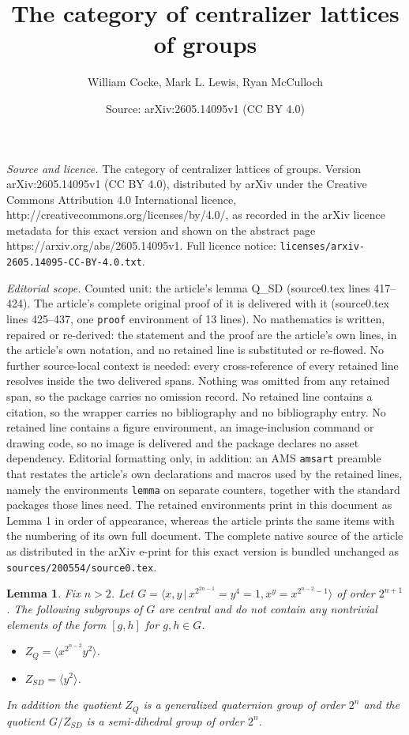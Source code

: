 \documentclass[10pt,a4paper]{amsart}
\title{The category of centralizer lattices of groups}
\author{William Cocke, Mark L. Lewis, Ryan McCulloch}
\date{Source: arXiv:2605.14095v1 (CC BY 4.0)}
\newtheorem{lemma}{Lemma}
\begin{document}
\maketitle

\noindent\emph{Source and licence.} The category of centralizer lattices of groups. Version arXiv:2605.14095v1 (CC BY 4.0), distributed by arXiv under the Creative Commons Attribution 4.0 International licence, http://creativecommons.org/licenses/by/4.0/, as recorded in the arXiv licence metadata for this exact version and shown on the abstract page https://arxiv.org/abs/2605.14095v1. Full licence notice: \texttt{licenses/arxiv-2605.14095-CC-BY-4.0.txt}.\par\smallskip

\noindent\textit{Editorial scope.} Counted unit: the article's lemma Q\_SD (source0.tex lines 417--424). The article's complete original proof of it is delivered with it (source0.tex lines 425--437, one \texttt{proof} environment of 13 lines). No mathematics is written, repaired or re-derived: the statement and the proof are the article's own lines, in the article's own notation, and no retained line is substituted or re-flowed.  No further source-local context is needed: every cross-reference of every retained line resolves inside the two delivered spans.  Nothing was omitted from any retained span, so the package carries no omission record.  No retained line contains a citation, so the wrapper carries no bibliography and no bibliography entry.  No retained line contains a figure environment, an image-inclusion command or drawing code, so no image is delivered and the package declares no asset dependency.  Editorial formatting only, in addition: an AMS \texttt{amsart} preamble that restates the article's own declarations and macros used by the retained lines, namely the environments \texttt{lemma} on separate counters, together with the standard packages those lines need.  The retained environments print in this document as Lemma 1 in order of appearance, whereas the article prints the same items with the numbering of its own full document.  The complete native source of the article as distributed in the arXiv e-print for this exact version is bundled unchanged as \texttt{sources/200554/source0.tex}.
\begin{lemma}\label{lem: Q_SD}
Fix $n>2$. Let $G =\langle x,y\,|\, x^{2^{2n-1}}=y^4 = 1, x^y = x^{2^{n-2}-1}\rangle$ of order $2^{n+1}$. 
The following subgroups of $G$ are central and do not contain any nontrivial elements of the form $[g,h]$ for $g,h\in G$. 
\begin{itemize} 
\item $Z_Q = \langle  x^{2^{n-2}} y^2 \rangle$.
\item $Z_{SD} = \langle y^2 \rangle$.
\end{itemize} In addition the quotient $Z_Q$ is a generalized quaternion group of order $2^n$ and the quotient $G/Z_{SD}$ is a semi-dihedral group of order $2^n$. 
\end{lemma}
\end{document}
